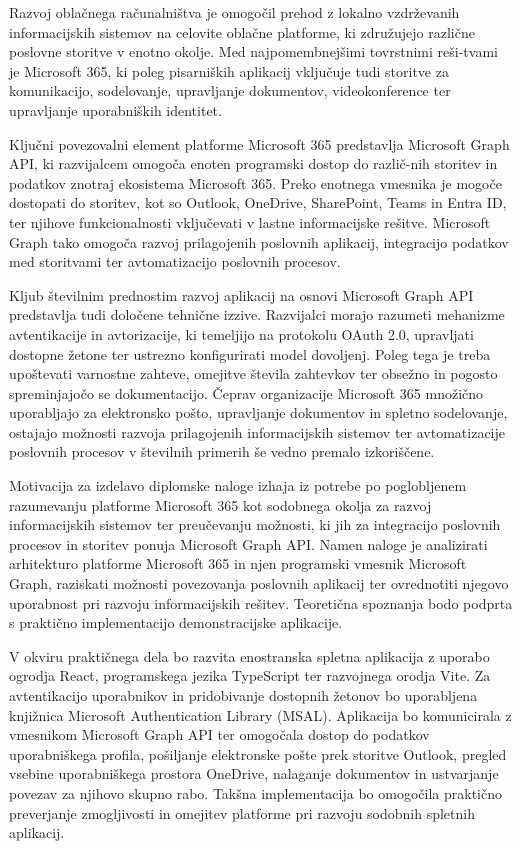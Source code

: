 \documentclass[a4paper, 12pt]{book}
\begin{document}
Razvoj oblačnega računalništva je omogočil prehod z lokalno vzdrževanih informacijskih sistemov na celovite oblačne platforme, ki združujejo različne poslovne storitve v enotno okolje.
Med najpomembnejšimi tovrstnimi reši-tvami je Microsoft 365, ki poleg pisarniških aplikacij vključuje tudi storitve za komunikacijo, sodelovanje, upravljanje dokumentov, videokonference ter upravljanje uporabniških identitet.

Ključni povezovalni element platforme Microsoft 365 predstavlja Microsoft Graph API, ki razvijalcem omogoča enoten programski dostop do različ-nih storitev in podatkov znotraj ekosistema Microsoft 365.
Preko enotnega vmesnika je mogoče dostopati do storitev, kot so Outlook, OneDrive, SharePoint, Teams in Entra ID, ter njihove funkcionalnosti vključevati v lastne informacijske rešitve. Microsoft Graph tako omogoča razvoj prilagojenih poslovnih aplikacij, integracijo podatkov med storitvami ter avtomatizacijo poslovnih procesov.

Kljub številnim prednostim razvoj aplikacij na osnovi Microsoft Graph API predstavlja tudi določene tehnične izzive. Razvijalci morajo razumeti mehanizme avtentikacije in avtorizacije, ki temeljijo na protokolu OAuth 2.0, upravljati dostopne žetone ter ustrezno konfigurirati model dovoljenj.
Poleg tega je treba upoštevati varnostne zahteve, omejitve števila zahtevkov ter obsežno in pogosto spreminjajočo se dokumentacijo.
Čeprav organizacije Microsoft 365 množično uporabljajo za elektronsko pošto, upravljanje dokumentov in spletno sodelovanje, ostajajo možnosti razvoja prilagojenih informacijskih sistemov ter avtomatizacije poslovnih procesov v številnih primerih še vedno premalo izkoriščene.

Motivacija za izdelavo diplomske naloge izhaja iz potrebe po poglobljenem razumevanju platforme Microsoft 365 kot sodobnega okolja za razvoj informacijskih sistemov ter preučevanju možnosti, ki jih za integracijo poslovnih procesov in storitev ponuja Microsoft Graph API.
Namen naloge je analizirati arhitekturo platforme Microsoft 365 in njen programski vmesnik Microsoft Graph, raziskati možnosti povezovanja poslovnih aplikacij ter ovrednotiti njegovo uporabnost pri razvoju informacijskih rešitev.
Teoretična spoznanja bodo podprta s praktično implementacijo demonstracijske aplikacije.

V okviru praktičnega dela bo razvita enostranska spletna aplikacija z uporabo ogrodja React, programskega jezika TypeScript ter razvojnega orodja Vite.
Za avtentikacijo uporabnikov in pridobivanje dostopnih žetonov bo uporabljena knjižnica Microsoft Authentication Library (MSAL).
Aplikacija bo komunicirala z vmesnikom Microsoft Graph API ter omogočala dostop do podatkov uporabniškega profila, pošiljanje elektronske pošte prek storitve Outlook, pregled vsebine uporabniškega prostora OneDrive, nalaganje dokumentov in ustvarjanje povezav za njihovo skupno rabo. Takšna implementacija bo omogočila praktično preverjanje zmogljivosti in omejitev platforme pri razvoju sodobnih spletnih aplikacij.
\end{document}
